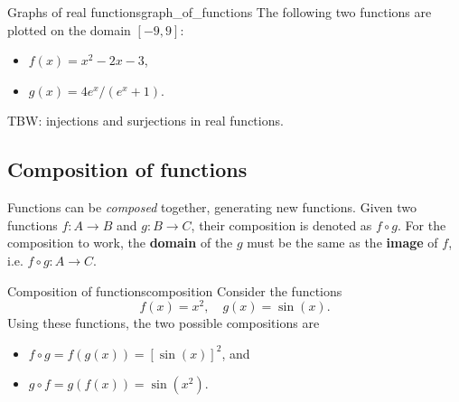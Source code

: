 \begin{example}{Graphs of real functions}{graph_of_functions}
	The following two functions are plotted on the domain $\left[ -9,9 \right]$:

	\begin{minipage}{0.3\textwidth}
		\begin{itemize}
			\item \textcolor{xred}{$f(x)=x^{2}-2x-3$},
			\item \textcolor{xgreen}{$g(x)=4e^{x}/\left( e^{x}+1 \right)$}.
		\end{itemize}
	\end{minipage}%
	\begin{minipage}[c]{0.7\textwidth}
		\centering
	\end{minipage}
\end{example}

TBW: injections and surjections in real functions.

\subsection{Composition of functions}
Functions can be \emph{composed} together, generating new functions. Given two functions $f:A\to B$ and $g:B\to C$, their composition is denoted as $f\circ g$. For the composition to work, the \textbf{domain} of the $g$ must be the same as the \textbf{image} of $f$, i.e. $f\circ g:A\to C$.

\begin{example}{Composition of functions}{composition}
	Consider the functions
	\[
		f(x)=x^{2},\quad g(x)=\sin(x).
	\]
	Using these functions, the two possible compositions are
	\begin{itemize}
		\item $f\circ g = f\left( g(x) \right) = \left[ \sin(x) \right]^{2}$, and
		\item $g\circ f = g\left( f(x) \right) = \sin\left( x^{2} \right)$.
	\end{itemize}
\end{example}

